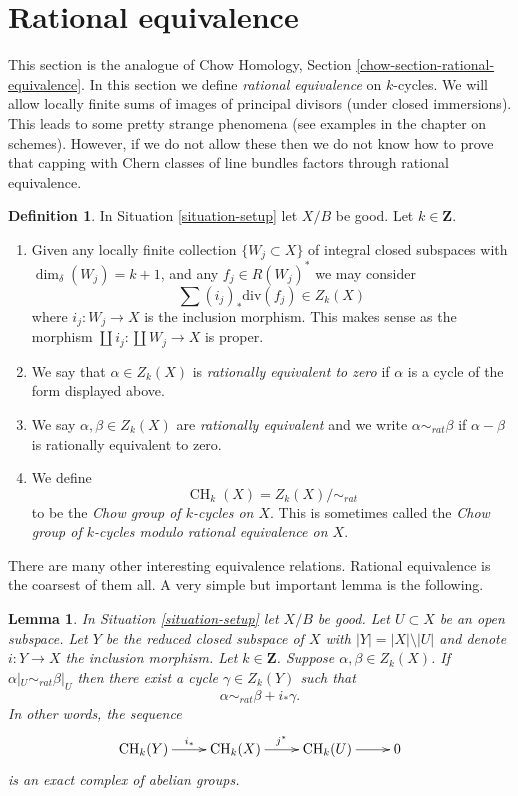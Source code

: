 \documentclass{stacks-project}
\theoremstyle{plain}
\newtheorem{lemma}[subsection]{Lemma}
\theoremstyle{definition}
\newtheorem{definition}[subsection]{Definition}
\theoremstyle{remark}
\numberwithin{equation}{subsection}
\def\CH{\mathop{\mathrm{CH}}\nolimits}
\begin{document}
\section{Rational equivalence}
\label{section-rational-equivalence}

\noindent
This section is the analogue of
Chow Homology, Section \ref{chow-section-rational-equivalence}.
In this section we define {\it rational equivalence} on $k$-cycles.
We will allow locally finite sums of images of
principal divisors (under closed immersions). This leads to some
pretty strange phenomena (see examples in the chapter on schemes).
However, if we do not allow these then we do not know how to prove that
capping with Chern classes of line bundles factors through rational
equivalence.

\begin{definition}
\label{definition-rational-equivalence}
In Situation \ref{situation-setup} let $X/B$ be good.
Let $k \in \mathbf{Z}$.
\begin{enumerate}
\item Given any locally finite collection $\{W_j \subset X\}$
of integral closed subspaces with $\dim_\delta(W_j) = k + 1$,
and any $f_j \in R(W_j)^*$ we may consider
$$
\sum (i_j)_*\text{div}(f_j) \in Z_k(X)
$$
where $i_j : W_j \to X$ is the inclusion morphism.
This makes sense as the morphism
$\coprod i_j : \coprod W_j \to X$ is proper.
\item We say that $\alpha \in Z_k(X)$ is {\it rationally equivalent to zero}
if $\alpha$ is a cycle of the form displayed above.
\item We say $\alpha, \beta \in Z_k(X)$ are
{\it rationally equivalent} and we write $\alpha \sim_{rat} \beta$
if $\alpha - \beta$ is rationally equivalent to zero.
\item We define
$$
\CH_k(X) = Z_k(X) / \sim_{rat}
$$
to be the {\it Chow group of $k$-cycles on $X$}. This is sometimes called
the {\it Chow group of $k$-cycles modulo rational equivalence on $X$}.
\end{enumerate}
\end{definition}

\noindent
There are many other interesting equivalence relations.
Rational equivalence is the coarsest of them all.
A very simple but important lemma is the following.

\begin{lemma}
\label{lemma-restrict-to-open}
In Situation \ref{situation-setup} let $X/B$ be good.
Let $U \subset X$ be an open subspace. Let $Y$ be the
reduced closed subspace of $X$ with $|Y| = |X| \setminus |U|$
and denote $i : Y \to X$ the inclusion morphism. Let $k \in \mathbf{Z}$.
Suppose $\alpha, \beta \in Z_k(X)$. If $\alpha|_U \sim_{rat} \beta|_U$
then there exist a cycle $\gamma \in Z_k(Y)$ such that
$$
\alpha \sim_{rat} \beta + i_*\gamma.
$$
In other words, the sequence
$$
\xymatrix{
\CH_k(Y) \ar[r]^{i_*} & \CH_k(X) \ar[r]^{j^*} & \CH_k(U) \ar[r] & 0
}
$$
is an exact complex of abelian groups.
\end{lemma}
\end{document}
